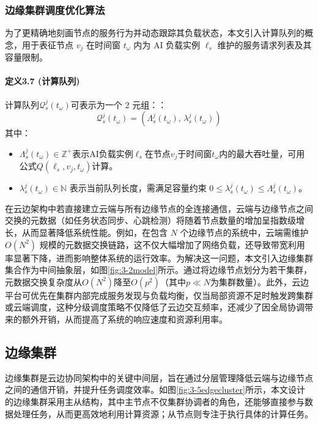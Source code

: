\subsubsection{边缘集群调度优化算法}


为了更精确地刻画节点的服务行为并动态跟踪其负载状态，本文引入计算队列的概念，用于表征节点 $v_j$ 在时间窗 $t_\omega$ 内为 AI 负载实例 $\ell_s$ 维护的服务请求列表及其容量限制。

\paragraph{定义3.7 (计算队列)} 计算队列$\mathcal{Q}_s^j(t_\omega)$可表示为一个 2 元组：：
\[
\mathcal{Q}_s^j(t_\omega) = \left( \Lambda_s^j(t_\omega),\, \lambda_s^j(t_\omega) \right)
\]
其中：
\begin{itemize}
    \item $\Lambda_s^j(t_\omega) \in \mathbb{Z}^+$表示AI负载实例$\ell_s$在节点$v_j$于时间窗$t_\omega$内的最大吞吐量，可用公式$Q(\ell_s, v_j, t_\omega)$计算。
    \item $\lambda_s^j(t_\omega) \in \mathbb{N}$ 表示当前队列长度，需满足容量约束 $0 \leq \lambda_s^j(t_\omega) \leq \Lambda_s^j(t_\omega)$。
\end{itemize}

在云边架构中若直接建立云端与所有边缘节点的全连接通信，云端与边缘节点之间交换的元数据（如任务状态同步、心跳检测）将随着节点数量的增加呈指数级增长，从而显著降低系统性能。例如，在包含 $N$ 个边缘节点的系统中，云端需维护 $O(N^2)$ 规模的元数据交换链路，这不仅大幅增加了网络负载，还导致带宽利用率显著下降，进而影响整体系统的运行效率。为解决这一问题，本文引入边缘集群集合作为中间抽象层，如图\ref{fig:3-2model}所示。通过将边缘节点划分为若干集群，元数据交换复杂度从$O(N^2)$降至$O(p^2)$（其中$p \ll N$为集群数量）。此外，云边平台可优先在集群内部完成服务发现与负载均衡，仅当局部资源不足时触发跨集群或云端调度，这种分级调度策略不仅降低了云边交互频率，还减少了因全局协调带来的额外开销，从而提高了系统的响应速度和资源利用率。

\subsection{边缘集群}

边缘集群是云边协同架构中的关键中间层，旨在通过分层管理降低云端与边缘节点之间的通信开销，并提升任务调度效率。如图\ref{fig:3-5edgecluster}所示，本文设计的边缘集群采用主从结构，其中主节点不仅集群协调者的角色，还能够直接参与数据处理任务，从而更高效地利用计算资源；从节点则专注于执行具体的计算任务。

